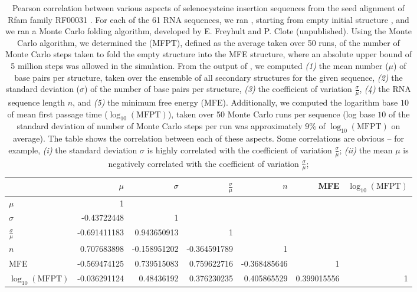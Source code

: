 \begin{landscape}
\begin{table}[!h]
\centering
\begin{tabular}{|l|rrrrrr|}
\hline
~ &$\mu$ &$\sigma$& $\frac{\sigma}{\mu}$& $n$ & MFE & $\log_{10}(\text{MFPT})$\\
\hline
$\mu$& 1 & & & & &\\
$\sigma$&-0.43722448& 1  & & & & \\
$\frac{\sigma}{\mu}$&-0.691411183&0.943650913&1 & & &\\
$n$&0.707683898&-0.158951202&-0.364591789&1& & \\
MFE&-0.569474125&0.739515083&0.759622716&-0.368485646&1 & \\
$\log_{10}(\text{MFPT})$&-0.036291124&0.48436192&0.376230235&0.405865529&0.399015556& 1 \\
\hline
\end{tabular}
\caption{Pearson correlation between various aspects of selenocysteine
insertion sequences from the seed alignment of Rfam family
RF00031 \cite{Gardner.nar11}.
For each of the 61 RNA sequences, we ran \fftbor, starting
from empty initial structure \strSt, and we ran a Monte Carlo
folding algorithm, developed by E. Freyhult and P. Clote (unpublished).
Using the Monte Carlo algorithm, we
determined the \mfpt (MFPT), defined as the average
taken over 50 runs, of the number of Monte Carlo steps taken to fold
the empty structure into the MFE structure, where an absolute upper bound
of 5 million steps was allowed in the simulation.  From the output of
\fftbor, we computed
{\em (1)}
the mean number ($\mu$) of base pairs per structure, taken over
the ensemble of all secondary structures for the given sequence,
{\em (2)}
the standard deviation ($\sigma$) of the number of base pairs per structure,
{\em (3)}
the coefficient of variation $\frac{\sigma}{\mu}$,
{\em (4)}
the RNA sequence length $n$,
and
{\em (5)}
the minimum free energy (MFE).  Additionally, we computed the
logarithm base $10$ of mean first passage
time ($\log_{10}(\text{MFPT})$), taken over 50 Monte Carlo runs per sequence
(log base $10$ of the standard deviation of number of Monte Carlo
steps per run was approximately
9\% of $\log_{10}(\text{MFPT})$ on average). The table shows the correlation between each of
these aspects.
Some correlations are obvious --
for example,
{\em (i)}
the standard deviation $\sigma$ is highly correlated with the
coefficient of variation $\frac{\sigma}{\mu}$;
{\em (ii)}
the mean $\mu$ is negatively correlated with the
coefficient of variation $\frac{\sigma}{\mu}$;
}
\end{table}
\end{landscape}
